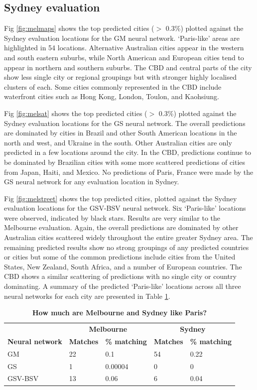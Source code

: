\documentclass[10pt,letterpaper,hidelinks]{article}
\begin{document}
\subsection*{Sydney evaluation} 

Fig \ref{fig:melmaps} shows the top predicted cities ($>$ 0.3\%) plotted against the Sydney evaluation locations for the GM neural network. `Paris-like' areas are highlighted in 54 locations.  Alternative Australian cities appear in the western and south eastern suburbs, while North American and European cities tend to appear in northern and southern suburbs. The CBD and central parts of the city show less single city or regional groupings but with stronger highly localised clusters of each. Some cities commonly represented in the CBD include waterfront cities such as Hong Kong, London, Toulon, and Kaohsiung. 

Fig \ref{fig:melsat} shows the top predicted cities ($>$ 0.3\%) plotted against the Sydney evaluation locations for the GS neural network. The overall predictions are dominated by cities in Brazil and other South American locations in the north and west, and Ukraine in the south. Other Australian cities are only predicted in a few locations around the city. In the CBD, predictions continue to be dominated by Brazilian cities with some more scattered predictions of cities from Japan, Haiti, and Mexico. No predictions of Paris, France were made by the GS neural network for any evaluation location in Sydney.

Fig \ref{fig:melstreet} shows the top predicted cities, plotted against the Sydney evaluation locations for the GSV-BSV neural network. Six `Paris-like' locations were observed, indicated by black stars. Results are very similar to the Melbourne evaluation. Again, the overall predictions are dominated by other Australian cities scattered widely throughout the entire greater Sydney area. The remaining predicted results show no strong groupings of any predicted countries or cities but some of the common predictions include cities from the United States, New Zealand, South Africa, and a number of European countries. The CBD shows a similar scattering of predictions with no single city or country dominating. A summary of the predicted `Paris-like' locations across all three neural networks for each city are presented in Table \ref{tab:melbournesydneyparis}.


\begin{table}[!htbp]
\caption{\bf How much are Melbourne and Sydney like Paris? \label{tab:melbournesydneyparis}}     
\begin{tabular}{ l  l l l  l}
 \hline    &  \multicolumn{2}{c}{\textbf{Melbourne}} & \multicolumn{2}{c}{\textbf{Sydney}}  \\  
\textbf{Neural network} & \textbf{Matches} & \textbf{\% matching}  & \textbf{Matches} & \textbf{\% matching}\\ \hline
GM & 22 & 0.1 & 54 & 0.22 \\ 
GS & 1 & 0.00004 & 0 & 0 \\ 
GSV-BSV & 13 & 0.06 & 6 & 0.04 \\ \hline
\end{tabular}
\end{table}
\end{document}
